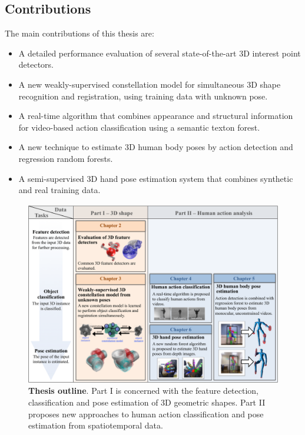\subsection{Contributions}

The main contributions of this thesis are:
\begin{itemize}
	\item A detailed performance evaluation of several state-of-the-art 3D interest point detectors.
	\item A new weakly-supervised constellation model for simultaneous 3D shape recognition and registration, using training data with unknown pose. 
	\item A real-time algorithm that combines appearance and structural information for video-based action classification using a semantic texton forest. 
	\item A new technique to estimate 3D human body poses by action detection and regression random forests. 
	\item A semi-supervised 3D hand pose estimation system that combines synthetic and real training data. 
\end{itemize}

\begin{figure}[t]
\centering
\includegraphics[width=1\linewidth]{./fig/intro/intro2.pdf}
\caption{\textbf{Thesis outline}. Part I is concerned with the feature detection, classification and pose estimation of 3D geometric shapes. Part II proposes new approaches to human action classification and pose estimation from spatiotemporal data.} 
\label{fig/intro/outline}
\end{figure}


